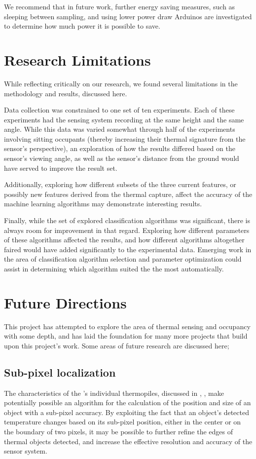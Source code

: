 \documentclass[../thesis/thesis.tex]{subfiles}
\begin{document}
We recommend that in future work, further energy saving measures, such as sleeping between sampling, and using lower power draw Arduinos are investigated to determine how much power it is possible to save.


\section{Research Limitations}
While reflecting critically on our research, we found several limitations in the methodology and results, discussed here.

Data collection was constrained to one set of ten experiments. Each of these experiments had the sensing system recording at the same height and the same angle. While this data was varied somewhat through half of the experiments involving sitting occupants (thereby increasing their thermal signature from the sensor's perspective), an exploration of how the results differed based on the sensor's viewing angle, as well as the sensor's distance from the ground would have served to improve the result set.

Additionally, exploring how different subsets of the three current features, or possibly new features derived from the thermal capture, affect the accuracy of the machine learning algorithms may demonstrate interesting results.


Finally, while the set of explored classification algorithms was significant, there is always room for improvement in that regard. Exploring how different parameters of these algorithms affected the results, and how different algorithms altogether faired would have added significantly to the experimental data. Emerging work in the area of classification algorithm selection and parameter optimization \cite{thornton2013auto} could assist in determining which algorithm suited the \mlx the most automatically.

\section{Future Directions}
This project has attempted to explore the area of thermal sensing and occupancy with some depth, and has laid the foundation for many more projects that build upon this project's work. Some areas of future research are discussed here;

\subsection{Sub-pixel localization}
The  characteristics of the \mlx's individual thermopiles, discussed in , , make potentially possible an algorithm for the calculation of the position and size of an object with a sub-pixel accuracy. By exploiting the fact that an object's detected temperature changes based on its sub-pixel position, either in the center or on the boundary of two pixels, it may be possible to further refine the edges of thermal objects detected, and increase the effective resolution and accuracy of the sensor system.
\end{document}
